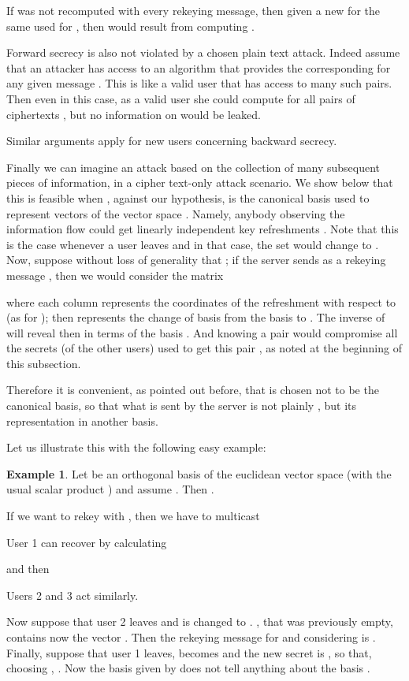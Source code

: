 \documentclass[a4paper,11pt]{amsart}
\theoremstyle{definition}
\newtheorem{example}[theorem]{Example}
\begin{document}
If  was not recomputed with every rekeying message, then given a
new  for the same  used for , then
 would result from computing
. 


Forward secrecy is also not violated by a chosen plain text attack. Indeed
assume that an attacker has access to an
algorithm that provides the corresponding  for any given
message . This is like a valid user that has access to many such
pairs. Then even in this case, as a valid user she could compute for
all pairs of ciphertexts , but no information on
 would be leaked. 

Similar arguments apply for new users concerning backward secrecy.


Finally we can imagine an attack based on the collection of many
subsequent pieces of information, in a cipher text-only attack
scenario. We show below that this is feasible when , against our
hypothesis, is the canonical basis used to represent vectors of the
vector space .
Namely, anybody observing the information flow could get  linearly
independent key refreshments .
Note that this is the case whenever a user  leaves and in that
case, the set  would change to . Now, suppose without
loss of generality that ; if the server sends  as a rekeying message , then we would consider the matrix



\noindent where each column  represents the
coordinates of the refreshment  with respect to  (as
 for ); then  represents the change
of basis from the basis 
to . The inverse of  will reveal then  in terms of the basis
. And knowing a pair  would compromise all the
secrets (of the other users) used to get this pair ,
as noted at the beginning of this subsection.

Therefore it is convenient, as pointed out before, that  is chosen
not to be the canonical
basis, so that what is sent by the server is not plainly , but its representation in another basis.


Let us illustrate this with the following easy example:

\medskip

\begin{example}
  Let  be an orthogonal basis of
  the euclidean vector space  (with the usual scalar
  product ) and assume . Then .

  If we want to rekey with , then we have to multicast

User 1 can recover  by calculating

and then
 
Users 2 and 3 act similarly.

Now suppose that user 2 leaves and  is changed to . , that was previously empty, contains now the vector .  Then
the rekeying message for  and considering  is . Finally, suppose that user 1 leaves,  becomes  and the new
secret  is , so that, choosing , . Now the basis given by  does not tell anything
about the basis .
\end{example}
\end{document}
